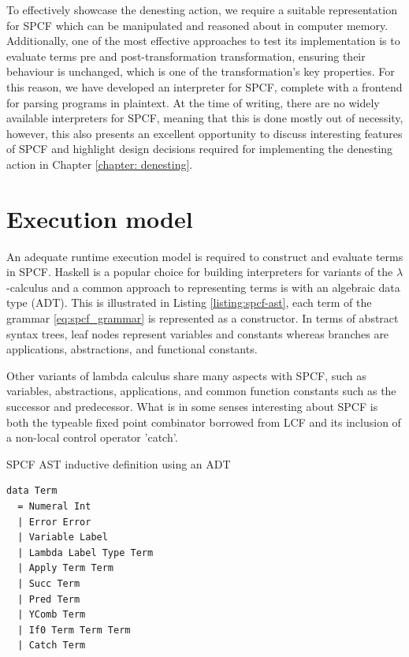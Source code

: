 \documentclass[12pt,a4paper]{report}
\theoremstyle{definition}
\theoremstyle{definition}
\theoremstyle{remark}
\begin{document}
To effectively showcase the denesting action, we require a suitable representation for SPCF which can be manipulated and reasoned about in computer memory. Additionally, one of the most effective approaches to test its implementation is to evaluate terms pre and post-transformation transformation, ensuring their behaviour is unchanged, which is one of the transformation's key properties. For this reason, we have developed an interpreter for SPCF, complete with a frontend for parsing programs in plaintext. At the time of writing, there are no widely available interpreters for SPCF, meaning that this is done mostly out of necessity, however, this also presents an excellent opportunity to discuss interesting features of SPCF and highlight design decisions required for implementing the denesting action in Chapter  \ref{chapter: denesting}.

\section{Execution model}\label{section: language representation}
An adequate runtime execution model is required to construct and evaluate terms in SPCF. Haskell is a popular choice for building interpreters for variants of the $\lambda$-calculus and a common approach to representing terms is with an algebraic data type (ADT). This is illustrated in Listing \ref{listing:spcf-ast}, each term of the grammar \eqref{eq:spcf_grammar} is represented as a constructor. In terms of abstract syntax trees, leaf nodes represent variables and constants whereas branches are applications, abstractions, and functional constants. 

Other variants of lambda calculus share many aspects with SPCF, such as variables, abstractions, applications, and common function constants such as the successor and predecessor. What is in some senses interesting about SPCF is both the typeable fixed point combinator borrowed from LCF and its inclusion of a non-local control operator 'catch'. 

\begin{listing}
\caption{SPCF AST inductive definition using an ADT}
\begin{verbatim}
data Term
  = Numeral Int
  | Error Error
  | Variable Label
  | Lambda Label Type Term
  | Apply Term Term 
  | Succ Term
  | Pred Term
  | YComb Term
  | If0 Term Term Term
  | Catch Term
\end{verbatim}
\label{listing:spcf-ast}
\end{listing}
\end{document}
